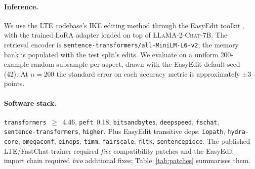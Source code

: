 \documentclass[11pt,a4paper,twocolumn]{article}
\begin{document}
\paragraph{Inference.} We use the LTE codebase's IKE editing method through the EasyEdit toolkit \citep{wang2024easyedit}, with the trained LoRA adapter loaded on top of \textsc{LLaMA-2-Chat-7B}. The retrieval encoder is \texttt{sentence-transformers/all-MiniLM-L6-v2}; the memory bank is populated with the test split's edits. We evaluate on a uniform 200-example random subsample per aspect, drawn with the EasyEdit default seed (42). At $n=200$ the standard error on each accuracy metric is approximately $\pm 3$ points.

\paragraph{Software stack.} \texttt{transformers}~$\geq$~4.46, \texttt{peft}~0.18, \texttt{bitsandbytes}, \texttt{deepspeed}, \texttt{fschat}, \texttt{sentence-transformers}, \texttt{higher}. Plus EasyEdit transitive deps: \texttt{iopath}, \texttt{hydra-core}, \texttt{omegaconf}, \texttt{einops}, \texttt{timm}, \texttt{fairscale}, \texttt{nltk}, \texttt{sentencepiece}. The published LTE/FastChat trainer required \emph{five} compatibility patches and the EasyEdit import chain required \emph{two} additional fixes; Table~\ref{tab:patches} summarises them.
\end{document}
